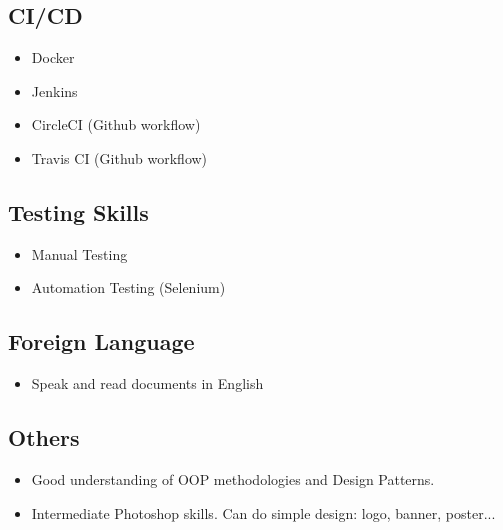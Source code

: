 \begin{cventries}
\begin{row}[cellsep=0.75cm]{3}{3}
\begin{cell}{1}
	\section*{CI/CD}
	\vspace{-1.5ex}
    \begin{itemize}
        \item {Docker}
        \item {Jenkins}
        \item {CircleCI (Github workflow)}
        \item {Travis CI (Github workflow)}
    \end{itemize}
	\end{cell}
\end{row}

\begin{row}[cellsep=0.75cm]{3}{3}
    \begin{cell}{1}
	\section*{Testing Skills}
	\vspace{-1.5ex}
    \begin{itemize}
        \item {Manual Testing}
        \item {Automation Testing (Selenium)}
    \end{itemize}
	\end{cell}
    \begin{cell}{1}
	\section*{Foreign Language}
	\vspace{-1.5ex}
    \begin{itemize}
        \item {Speak and read documents in English}
    \end{itemize}
	\end{cell}
	\begin{cell}{1}
	\section*{Others}
	\vspace{-1.5ex}
    \begin{itemize}
        \item {Good understanding of OOP methodologies and Design Patterns.}
        \item {Intermediate Photoshop skills. Can do simple design: logo, banner, poster...}
    \end{itemize}
	\end{cell}
\end{row}

\end{cventries}
